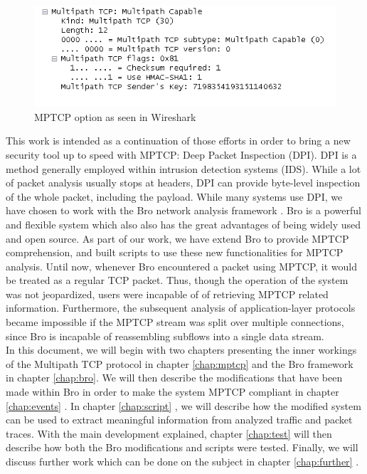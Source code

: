 \begin{figure}[!t]
\centering
\includegraphics[width=\columnwidth]{Figures/wiresharkdemo.png}
\caption{MPTCP option as seen in Wireshark}
\label{pic:wshark demo}
\end{figure}

This work is intended as a continuation of those efforts in order to bring a new security tool up to speed with MPTCP: Deep Packet Inspection (DPI). DPI is a method generally employed within intrusion detection systems (IDS). While a lot of packet analysis usually stops at headers, DPI can provide byte-level inspection of the whole packet, including the payload. While many systems use DPI, we have chosen to work with the Bro network analysis framework \cite{bro} . Bro is a powerful and flexible system which also also has the great advantages of being widely used and open source. As part of our work, we have extend Bro to provide MPTCP comprehension, and built scripts to use these new functionalities for MPTCP analysis. Until now, whenever Bro encountered a packet using MPTCP, it would be treated as a regular TCP packet. Thus, though the operation of the system was not jeopardized, users were incapable of of retrieving MPTCP related information. Furthermore, the subsequent analysis of application-layer protocols became impossible if the MPTCP stream was split over multiple connections, since Bro is incapable of reassembling subflows into a single data stream. \\

In this document, we will begin with two chapters presenting the inner workings of the Multipath TCP protocol in chapter \ref{chap:mptcp} and the Bro framework in chapter \ref{chap:bro}. We will then describe the modifications that have been made within Bro in order to make the system MPTCP compliant in chapter \ref{chap:events} . In chapter \ref{chap:script} , we will describe how the modified system can be used to extract meaningful information from analyzed traffic and packet traces. With the main development explained, chapter \ref{chap:test} will then describe how both the Bro modifications and scripts were tested. Finally, we will discuss further work which can be done on the subject in chapter \ref{chap:further} .
